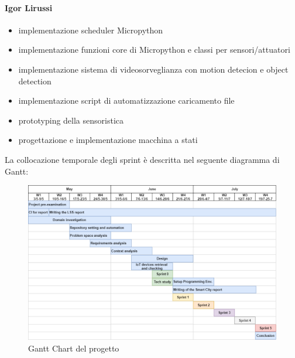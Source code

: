 \paragraph{Igor Lirussi}
\begin{itemize}
    \item implementazione scheduler Micropython
    \item implementazione funzioni core di Micropython e classi per sensori/attuatori
    \item implementazione sistema di videosorveglianza con motion detecion e object detection
    \item implementazione script di automatizzazione caricamento file
    \item prototyping della sensoristica
    \item progettazione e implementazione macchina a stati 
\end{itemize}
La collocazione temporale degli sprint è descritta nel seguente diagramma di Gantt: 
\begin{figure}[H]
    \caption{Gantt Chart del progetto}
    \label{fig:Gantt}
    \centering
   \includegraphics[width=1\textwidth]{DrawIo/GanttChart.png}
\end{figure}